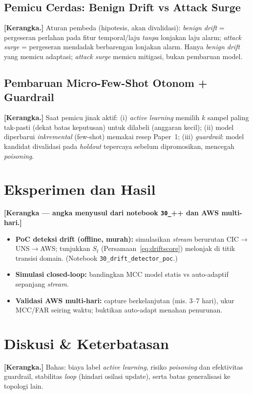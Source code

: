 \documentclass[11pt,a4paper]{article}
\begin{document}
\subsection{Pemicu Cerdas: Benign Drift vs Attack Surge}
\label{sec:trigger}
\textbf{[Kerangka.]} Aturan pembeda (hipotesis, akan divalidasi): \emph{benign
drift} = pergeseran perlahan pada fitur temporal/laju \emph{tanpa} lonjakan laju
alarm; \emph{attack surge} = pergeseran mendadak berbarengan lonjakan alarm.
Hanya \emph{benign drift} yang memicu adaptasi; \emph{attack surge} memicu
mitigasi, bukan pembaruan model.

\subsection{Pembaruan Micro-Few-Shot Otonom + Guardrail}
\label{sec:update}
\textbf{[Kerangka.]} Saat pemicu jinak aktif: (i) \emph{active learning} memilih
$k$ sampel paling tak-pasti (dekat batas keputusan) untuk dilabeli (anggaran
kecil); (ii) model diperbarui \emph{inkremental} (few-shot) memakai resep Paper~1;
(iii) \emph{guardrail}: model kandidat divalidasi pada \emph{holdout} tepercaya
sebelum dipromosikan, mencegah \emph{poisoning}.

\section{Eksperimen dan Hasil}
\label{sec:eval}
\textbf{[Kerangka — angka menyusul dari notebook \texttt{30\_}++ dan AWS multi-hari.]}
\begin{itemize}
  \item \textbf{PoC deteksi drift (offline, murah):} simulasikan \emph{stream}
  berurutan CIC$\rightarrow$UNS$\rightarrow$AWS; tunjukkan $S_t$ (Persamaan~\ref{eq:driftscore})
  melonjak di titik transisi domain. (Notebook \texttt{30\_drift\_detector\_poc}.)
  \item \textbf{Simulasi closed-loop:} bandingkan MCC model statis vs
  auto-adaptif sepanjang \emph{stream}.
  \item \textbf{Validasi AWS multi-hari:} capture berkelanjutan (mis. 3--7 hari),
  ukur MCC/FAR seiring waktu; buktikan auto-adapt menahan penurunan.
\end{itemize}

\section{Diskusi \& Keterbatasan}
\label{sec:discussion}
\textbf{[Kerangka.]} Bahas: biaya label \emph{active learning}, risiko
\emph{poisoning} dan efektivitas guardrail, stabilitas \emph{loop} (hindari
osilasi update), serta batas generalisasi ke topologi lain.
\end{document}
